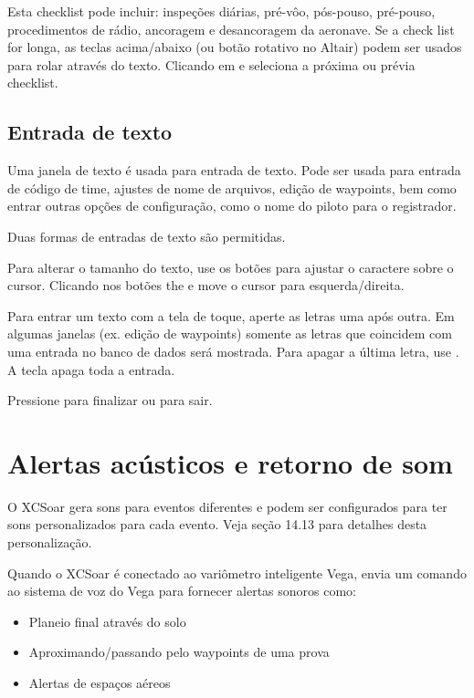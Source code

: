 Esta checklist pode incluir: inspeções diárias, pré-vôo, pós-pouso, pré-pouso, procedimentos de rádio, ancoragem e desancoragem da aeronave.
Se a check list for longa, as teclas acima/abaixo (ou botão rotativo no Altair) podem ser usados para rolar através do texto.  Clicando em \bmenuw{$<$} e \bmenuw{$>$} seleciona a próxima ou prévia checklist.



\subsection*{Entrada de texto} \label{sec:textentry}

Uma janela de texto é usada para entrada de texto.  Pode ser usada para entrada de código de time, ajustes de nome de arquivos, edição de waypoints, bem como entrar outras opções de configuração, como o nome do piloto para o registrador.

Duas formas de entradas de texto são permitidas.  

Para alterar o tamanho do texto, use os botões 
para ajustar o caractere sobre o cursor. Clicando nos botões the \button{$<$} 
e \button{$>$} move o cursor para esquerda/direita.  

Para entrar um texto com a tela de toque, aperte as letras uma após outra.  Em algumas janelas (ex. edição de waypoints) somente as letras que coincidem com uma entrada no banco de dados será mostrada.  Para apagar a última letra, use\button{$<-$} . A tecla  apaga toda a entrada.

Pressione  para finalizar ou  para sair. 



\section{Alertas acústicos e retorno de som}

O XCSoar gera sons para eventos diferentes e podem ser configurados para ter sons personalizados para cada evento.  Veja seção 14.13 para detalhes desta personalização.

Quando o XCSoar é conectado ao variômetro inteligente Vega, envia um comando ao sistema de voz do Vega para fornecer alertas sonoros como:

\begin{itemize}
\item Planeio final através do solo
\item Aproximando/passando pelo waypoints de uma prova
\item Alertas de espaços aéreos
\end{itemize}

